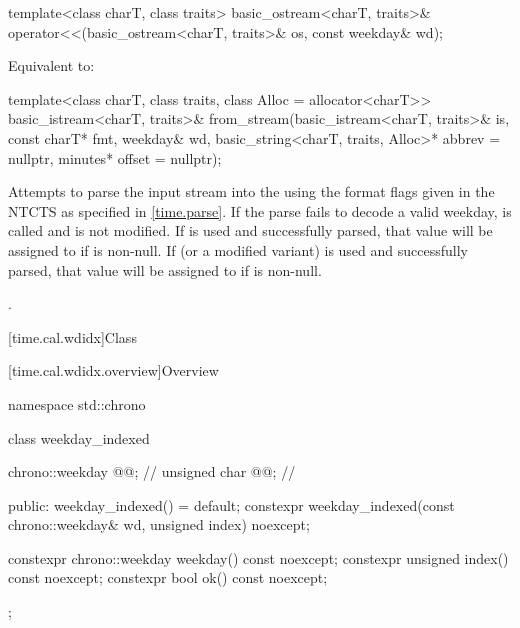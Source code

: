 %
\begin{itemdecl}
template<class charT, class traits>
  basic_ostream<charT, traits>&
    operator<<(basic_ostream<charT, traits>& os, const weekday& wd);
\end{itemdecl}

\begin{itemdescr}
\pnum
\effects
Equivalent to:
\end{itemdescr}

%
\begin{itemdecl}
template<class charT, class traits, class Alloc = allocator<charT>>
  basic_istream<charT, traits>&
    from_stream(basic_istream<charT, traits>& is, const charT* fmt,
                weekday& wd, basic_string<charT, traits, Alloc>* abbrev = nullptr,
                minutes* offset = nullptr);
\end{itemdecl}

\begin{itemdescr}
\pnum
\effects
Attempts to parse the input stream 
into the   using
the format flags given in the NTCTS 
as specified in \ref{time.parse}.
If the parse fails to decode a valid weekday,
 is called and
 is not modified.
If  is used and successfully parsed,
that value will be assigned to  if  is non-null.
If  (or a modified variant) is used and successfully parsed,
that value will be assigned to  if  is non-null.

\pnum
\returns
{}.
\end{itemdescr}

[time.cal.wdidx]{Class }

[time.cal.wdidx.overview]{Overview}

\begin{codeblock}
namespace std::chrono {
  class weekday_indexed {
    chrono::weekday  @@;       // \expos
    unsigned char    @@;    // \expos

  public:
    weekday_indexed() = default;
    constexpr weekday_indexed(const chrono::weekday& wd, unsigned index) noexcept;

    constexpr chrono::weekday weekday() const noexcept;
    constexpr unsigned        index()   const noexcept;
    constexpr bool ok() const noexcept;
  };
}
\end{codeblock}

